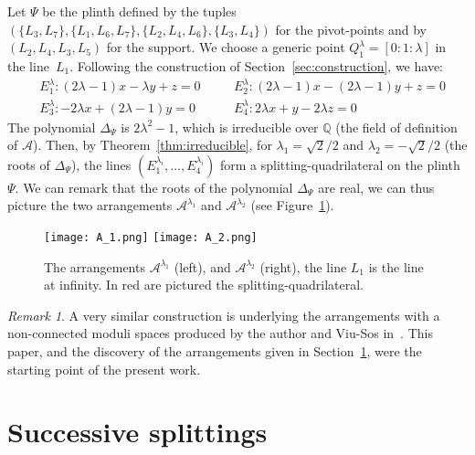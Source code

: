 \documentclass[11pt, a4paper]{amsart}
\theoremstyle{definition}
\theoremstyle{remark}
\newtheorem{rmk}[theorem]{Remark}
\newcommand{\QQ}{\mathds{Q}}
\newcommand{\A}{\mathcal{A}}
\begin{document}
Let $\Psi$ be the plinth defined by the tuples $(\{L_3,L_7\},\{L_1,L_6,L_7\},\{L_2,L_4,L_6\},\{L_3,L_4\})$ for the pivot-points and by $(L_2,L_4,L_3,L_5)$ for the support. We choose a generic point $Q_1^\lambda=[0 : 1 : \lambda]$ in the line~$L_1$. Following the construction of Section~\ref{sec:construction}, we have:
\begin{align*}
	& E_1^\lambda: (2\lambda -1) x - \lambda y + z =0 \quad & 
	& E_2^\lambda: (2\lambda -1) x - (2\lambda -1) y + z = 0 \\
	& E_3^\lambda: -2 \lambda x + (2\lambda -1) y = 0 \quad & 
	& E_4^\lambda: 2 \lambda x + y - 2\lambda z = 0
\end{align*}
The polynomial $\Delta_\Psi$ is $2\lambda^2 - 1$, which is irreducible over $\QQ$ (the field of definition of $\A$). Then, by Theorem~\ref{thm:irreducible}, for $\lambda_1=\sqrt{2}/2$ and $\lambda_2=-\sqrt{2}/2$ (the roots of $\Delta_\Psi$), the lines $(E_1^{\lambda_i},\dots,E_4^{\lambda_i})$ form a splitting-quadrilateral on the plinth $\Psi$. We can remark that the roots of the polynomial $\Delta_\Psi$ are real, we can thus picture the two arrangements $\A^{\lambda_1}$ and $\A^{\lambda_2}$ (see Figure~\ref{fig:splitting_quadri}).

\begin{figure}[h!]
	\centering
	\texttt{[image: A\_1.png]}
	\hspace{0.25cm}
	\texttt{[image: A\_2.png]}
	\caption{The arrangements $\A^{\lambda_1}$ (left), and $\A^{\lambda_2}$ (right), the line $L_1$ is the line at infinity. In red are pictured the splitting-quadrilateral. \label{fig:splitting_quadri} }
\end{figure}

\begin{rmk}
	A very similar construction is underlying the arrangements with a non-connected moduli spaces produced by the author and Viu-Sos in~\cite{GueViu:configurations}. This paper, and the discovery of the arrangements given in Section~\ref{sec:successive}, were the starting point of the present work.
\end{rmk}

\section{Successive splittings}\label{sec:successive}
\end{document}
